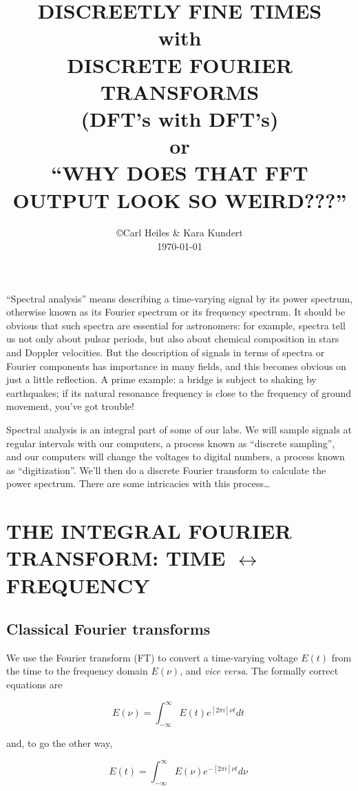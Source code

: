\documentclass[preprint]{aastex}
\begin{document}
\setcounter{section}{-1}

\title{DISCREETLY FINE TIMES \\ with \\ DISCRETE FOURIER TRANSFORMS \\
(DFT's with DFT's) \\ or \\ ``WHY DOES THAT FFT OUTPUT LOOK SO
WEIRD???''}

\author{\copyright Carl Heiles \& Kara Kundert \\ \today }

          ``Spectral analysis'' means describing a time-varying signal
by its power spectrum, otherwise known as its Fourier spectrum or its
frequency spectrum.  It should be obvious that such spectra are essential for
astronomers: for example, spectra tell us not only about pulsar periods,
but also about chemical composition in stars and Doppler velocities. 
But the description of signals in terms of spectra or Fourier components
has importance in many fields, and this becomes obvious on just a little
reflection.  A prime example: a bridge is subject to shaking by
earthquakes; if its natural resonance frequency is close to the
frequency of ground movement, you've got trouble!

	Spectral analysis is an integral part of some of our labs.  We
will sample signals at regular intervals with our computers, a process
known as ``discrete sampling'', and our computers will change the
voltages to digital numbers, a process known as ``digitization''. We'll
then do a discrete Fourier transform to calculate the power spectrum.
There are some intricacies with this process\dots

\tableofcontents

\section{THE INTEGRAL FOURIER TRANSFORM: TIME $\leftrightarrow$ FREQUENCY}

\subsection{Classical Fourier transforms}

          We use the Fourier transform (FT) to convert a time-varying
voltage $E(t)$ from the time to the frequency domain $E(\nu)$, and {\it
vice versa}.  The formally correct equations are

\begin{mathletters} \begin{equation}
\label{eqone}
E(\nu) = \int_{-\infty}^{\infty} E(t) e^{[2 \pi i]\nu t}  dt \; 
\end{equation}

\noindent and, to go the other way, 

\begin{equation}
 \label{eqoneb}
E(t) = \int_{-\infty}^{\infty} E(\nu) e^{-[2 \pi i]\nu t}  d\nu \; 
\end{equation}
\end{mathletters}
\end{document}
